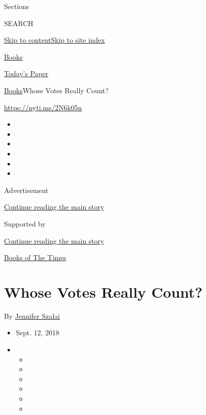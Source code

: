 Sections

SEARCH

\protect\hyperlink{site-content}{Skip to
content}\protect\hyperlink{site-index}{Skip to site index}

\href{https://www.nytimes3xbfgragh.onion/section/books}{Books}

\href{https://myaccount.nytimes3xbfgragh.onion/auth/login?response_type=cookie\&client_id=vi}{}

\href{https://www.nytimes3xbfgragh.onion/section/todayspaper}{Today's
Paper}

\href{/section/books}{Books}\textbar{}Whose Votes Really Count?

\url{https://nyti.ms/2N6k05n}

\begin{itemize}
\item
\item
\item
\item
\item
\item
\end{itemize}

Advertisement

\protect\hyperlink{after-top}{Continue reading the main story}

Supported by

\protect\hyperlink{after-sponsor}{Continue reading the main story}

\href{/column/books-of-the-times}{Books of The Times}

\hypertarget{whose-votes-really-count}{%
\section{Whose Votes Really Count?}\label{whose-votes-really-count}}

By \href{https://www.nytimes3xbfgragh.onion/by/jennifer-szalai}{Jennifer
Szalai}

\begin{itemize}
\item
  Sept. 12, 2018
\item
  \begin{itemize}
  \item
  \item
  \item
  \item
  \item
  \item
  \end{itemize}
\end{itemize}

